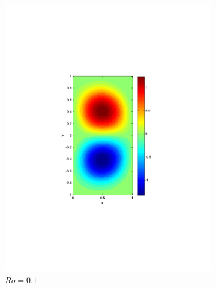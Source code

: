 \begin{figure}
\begin{center}
\begin{subfigure}{0.3\textwidth}
    \includegraphics[scale=0.5]{Figures/Re200Ro1E-1h16k1000}
    \caption{$Ro=0.1$}
    \label{sfi:QGERo0.1}
  \end{subfigure}
  \begin{subfigure}{0.3\textwidth}
    \vspace{1.3em}
    \centering

\end{subfigure}
\end{center}
\end{figure}

